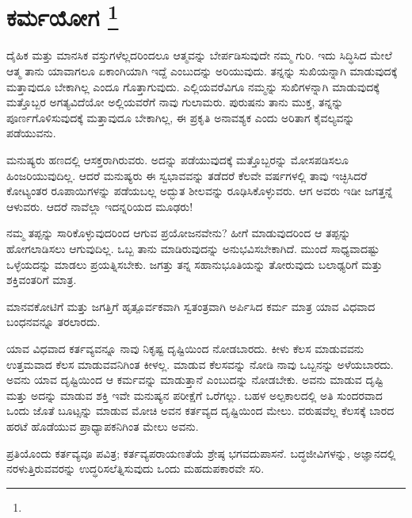 
\vspace{-0.6cm}

\chapter[ಕರ್ಮಯೋಗ ]{ಕರ್ಮಯೋಗ \protect\footnote{}}

ದೈಹಿಕ ಮತ್ತು ಮಾನಸಿಕ ವಸ್ತುಗಳೆಲ್ಲದರಿಂದಲೂ ಆತ್ಮವನ್ನು ಬೇರ್ಪಡಿಸುವುದೇ ನಮ್ಮ ಗುರಿ. ಇದು ಸಿದ್ಧಿಸಿದ ಮೇಲೆ ಆತ್ಮ ತಾನು ಯಾವಾಗಲೂ ಏಕಾಂಗಿಯಾಗಿ ಇದ್ದೆ ಎಂಬುದನ್ನು ಅರಿಯುವುದು. ತನ್ನನ್ನು ಸುಖಿಯನ್ನಾಗಿ ಮಾಡುವುದಕ್ಕೆ ಮತ್ತಾವುದೂ ಬೇಕಾಗಿಲ್ಲ ಎಂದೂ ಗೊತ್ತಾಗುವುದು. ಎಲ್ಲಿಯವರೆವಿಗೂ ನಮ್ಮನ್ನು ಸುಖಿಗಳನ್ನಾಗಿ ಮಾಡುವುದಕ್ಕೆ ಮತ್ತೊಬ್ಬರ ಅಗತ್ಯವಿದೆಯೋ ಅಲ್ಲಿಯವರೆಗೆ ನಾವು ಗುಲಾಮರು. ಪುರುಷನು ತಾನು ಮುಕ್ತ, ತನ್ನನ್ನು ಪೂರ್ಣಗೊಳಿಸುವುದಕ್ಕೆ ಮತ್ತಾವುದೂ ಬೇಕಾಗಿಲ್ಲ, ಈ ಪ್ರಕೃತಿ ಅನಾವಶ್ಯಕ ಎಂದು ಅರಿತಾಗ ಕೈವಲ್ಯವನ್ನು ಪಡೆಯುವನು.

\vskip 3pt

ಮನುಷ್ಯರು ಹಣದಲ್ಲಿ ಆಸಕ್ತರಾಗಿರುವರು. ಅದನ್ನು ಪಡೆಯುವುದಕ್ಕೆ ಮತ್ತೊಬ್ಬರನ್ನು ಮೋಸಪಡಿಸಲೂ ಹಿಂಜರಿಯುವುದಿಲ್ಲ. ಆದರೆ ಮನುಷ್ಯರು ಈ ಸ್ವಭಾವವನ್ನು ತಡೆದರೆ ಕೆಲವೇ ವರ್ಷಗಳಲ್ಲಿ ತಾವು ಇಚ್ಛಿಸಿದರೆ ಕೋಟ್ಯಂತರ ರೂಪಾಯಿಗಳನ್ನು ಪಡೆಯಬಲ್ಲ ಅದ್ಭುತ ಶೀಲವನ್ನು ರೂಢಿಸಿಕೊಳ್ಳುವರು. ಆಗ ಅವರು ಇಡೀ ಜಗತ್ತನ್ನೆ ಆಳುವರು. ಆದರೆ ನಾವೆಲ್ಲಾ ಇದನ್ನರಿಯದ ಮೂಢರು!

\vskip 3pt

ನಮ್ಮ ತಪ್ಪನ್ನು ಸಾರಿಕೊಳ್ಳುವುದರಿಂದ ಆಗುವ ಪ್ರಯೋಜನವೇನು? ಹೀಗೆ ಮಾಡುವುದರಿಂದ ಆ ತಪ್ಪನ್ನು ಹೋಗಲಾಡಿಸಲು ಆಗುವುದಿಲ್ಲ. ಒಬ್ಬ ತಾನು ಮಾಡಿರುವುದನ್ನು ಅನುಭವಿಸಬೇಕಾಗಿದೆ. ಮುಂದೆ ಸಾಧ್ಯವಾದಷ್ಟು ಒಳ್ಳೆಯದನ್ನು ಮಾಡಲು ಪ್ರಯತ್ನಿಸಬೇಕು. ಜಗತ್ತು ತನ್ನ ಸಹಾನುಭೂತಿಯನ್ನು ತೋರುವುದು ಬಲಾಢ್ಯರಿಗೆ ಮತ್ತು ಶಕ್ತಿವಂತರಿಗೆ ಮಾತ್ರ.

\vskip 3pt

ಮಾನವಕೋಟಿಗೆ ಮತ್ತು ಜಗತ್ತಿಗೆ ಹೃತ್ಪೂರ್ವಕವಾಗಿ ಸ್ವತಂತ್ರವಾಗಿ ಅರ್ಪಿಸಿದ ಕರ್ಮ ಮಾತ್ರ ಯಾವ ವಿಧವಾದ ಬಂಧನವನ್ನೂ ತರಲಾರದು.

\vskip 3pt

ಯಾವ ವಿಧವಾದ ಕರ್ತವ್ಯವನ್ನೂ ನಾವು ನಿಕೃಷ್ಟ ದೃಷ್ಟಿಯಿಂದ ನೋಡಬಾರದು. ಕೀಳು ಕೆಲಸ ಮಾಡುವವನು ಉತ್ತಮವಾದ ಕೆಲಸ ಮಾಡುವವನಿಗಿಂತ ಕೀಳಲ್ಲ. ಮಾಡುವ ಕೆಲಸವನ್ನು ನೋಡಿ ನಾವು ಒಬ್ಬನನ್ನು ಅಳೆಯಬಾರದು. ಅವನು ಯಾವ ದೃಷ್ಟಿಯಿಂದ ಆ ಕರ್ಮವನ್ನು ಮಾಡುತ್ತಾನೆ ಎಂಬುದನ್ನು ನೋಡಬೇಕು. ಅವನು ಮಾಡುವ ದೃಷ್ಟಿ ಮತ್ತು ಅದನ್ನು ಮಾಡುವ ಶಕ್ತಿ ಇವೇ ಮನುಷ್ಯನ ಪರೀಕ್ಷೆಗೆ ಒರೆಗಲ್ಲು. ಬಹಳ ಅಲ್ಪಕಾಲದಲ್ಲಿ ಅತಿ ಸುಂದರವಾದ ಒಂದು ಜೊತೆ ಬೂಟ್ಸನ್ನು ಮಾಡುವ ಮೋಚಿ ಅವನ ಕರ್ತವ್ಯದ ದೃಷ್ಟಿಯಿಂದ ಮೇಲು. ವರುಷವೆಲ್ಲ ಕೆಲಸಕ್ಕೆ ಬಾರದ ಹರಟೆ ಹೊಡೆಯುವ ಪ್ರಾಧ್ಯಾಪಕನಿಗಿಂತ ಮೇಲು ಅವನು.

\vskip 3pt

ಪ್ರತಿಯೊಂದು ಕರ್ತವ್ಯವೂ ಪವಿತ್ರ; ಕರ್ತವ್ಯಪರಾಯಣತೆಯೆ ಶ್ರೇಷ್ಠ ಭಗವದುಪಾಸನೆ. ಬದ್ಧಜೀವಿಗಳನ್ನು, ಅಜ್ಞಾನದಲ್ಲಿ ನರಳುತ್ತಿರುವವರನ್ನು ಉದ್ಧರಿಸಲೆತ್ನಿಸುವುದು ಒಂದು ಮಹದುಪಕಾರವೇ ಸರಿ.

\vskip 3pt

